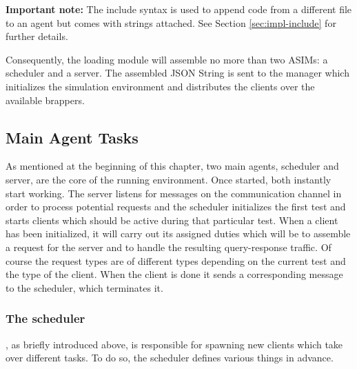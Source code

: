 \textbf{Important note:} The include syntax is used to append code from a different file to an agent but comes with strings attached. See Section \ref{sec:impl-include} for further details.

Consequently, the loading module will assemble no more than two ASIMs: a scheduler and a server. The assembled JSON String is sent to the manager which initializes the simulation environment and distributes the clients over the available brappers.

\subsection{Main Agent Tasks}
\label{subsec:impl-agent-tasks}

As mentioned at the beginning of this chapter, two main agents, scheduler and server, are the core of the running environment. Once started, both instantly start working. The server listens for messages on the communication channel in order to process potential requests and the scheduler  initializes the first test and starts clients which should be active during that particular test. When a client has been initialized, it will carry out its assigned duties which will be to assemble a request for the server and to handle the resulting query-response traffic. Of course the request types are of different types depending on the current test and the type of the client. When the client is done it sends a corresponding message to the scheduler, which terminates it.

\subsubsection{The scheduler}, as briefly introduced above, is responsible for spawning new clients which take over different tasks. To do so, the scheduler defines various things in advance.

